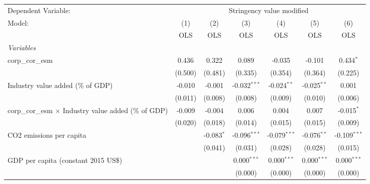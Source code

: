 
\begingroup
\centering
\begin{tabular}{lcccccc}
   \toprule
   Dependent Variable: & \multicolumn{6}{c}{Stringency value modified}\\
   Model:                                                       & (1)     & (2)          & (3)            & (4)            & (5)           & (6)\\  
                                                                &  OLS    & OLS          & OLS            & OLS            & OLS           & OLS\\  
   \midrule
   \emph{Variables}\\
   corp\_cor\_esm                                               & 0.436   & 0.322        & 0.089          & -0.035         & -0.101        & 0.434$^{*}$\\   
                                                                & (0.500) & (0.481)      & (0.335)        & (0.354)        & (0.364)       & (0.225)\\   
   Industry value added (\% of GDP)                             & -0.010  & -0.001       & -0.032$^{***}$ & -0.024$^{**}$  & -0.025$^{**}$ & 0.001\\   
                                                                & (0.011) & (0.008)      & (0.008)        & (0.009)        & (0.010)       & (0.006)\\   
   corp\_cor\_esm $\times$ Industry value added (\% of GDP)     & -0.009  & -0.004       & 0.006          & 0.004          & 0.007         & -0.015$^{*}$\\   
                                                                & (0.020) & (0.018)      & (0.014)        & (0.015)        & (0.015)       & (0.009)\\   
   CO2 emissions per capita                                     &         & -0.083$^{*}$ & -0.096$^{***}$ & -0.079$^{***}$ & -0.076$^{**}$ & -0.109$^{***}$\\   
                                                                &         & (0.041)      & (0.031)        & (0.028)        & (0.028)       & (0.015)\\   
   GDP per capita (constant 2015 US\$)                          &         &              & 0.000$^{***}$  & 0.000$^{***}$  & 0.000$^{***}$ & 0.000$^{***}$\\   
                                                                &         &              & (0.000)        & (0.000)        & (0.000)       & (0.000)\\   

\end{tabular}

